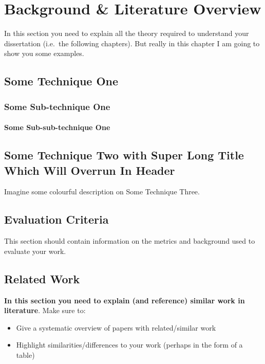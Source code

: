 \chapter{Background \& Literature Overview}

In this section you need to explain all the theory required to understand your dissertation (i.e.\ the following chapters). But really in this chapter I am going to show you some examples.

\section{Some Technique One}
\blindtext
\subsection{Some Sub-technique One}
\blindtext
{}
\blindtext
\subsubsection{Some Sub-sub-technique One}
\blindtext
{}
\blindtext
{}

\section[Some Technique Two]{Some Technique Two with Super Long Title Which Will Overrun In Header}
\blindtext[5]

Imagine some colourful description on Some Technique Three.


\section{Evaluation Criteria}
This section should contain information on the metrics and background used to evaluate your work.

\section{Related Work}
\textbf{In this section you need to explain (and reference) similar work in literature}.  Make sure to:

\begin{itemize}
 \item Give a systematic overview of papers with related/similar work
 \item Highlight similarities/differences to your work (perhaps in the form of a table)
\end{itemize}

